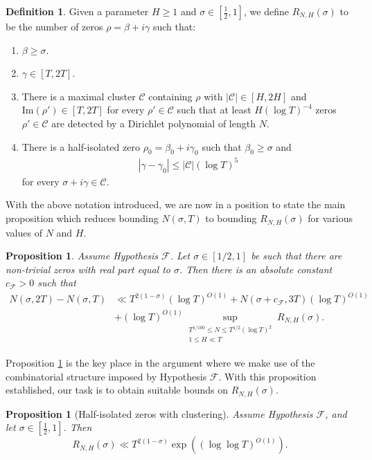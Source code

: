 \documentclass[12pt]{amsart}
\theoremstyle{plain}
\newtheorem{proposition}[theorem]{Proposition}
\theoremstyle{definition}
\newtheorem{definition}[theorem]{Definition}
\theoremstyle{remark}
\begin{document}
\begin{definition}\label{defn:RNH}
Given a parameter $H \ge 1$ and $\sigma \in [\frac{1}{2},1]$, we define $R_{N,H}(\sigma)$ to be the number of zeros $\rho = \beta+i\gamma$ such that:
%
\begin{enumerate}
\item $\beta \geq \sigma$.
\item $\gamma \in [T,2T]$.
\item There is a maximal cluster $\mathcal{C}$ containing $\rho$ with $|\mathcal{C}|\in[H,2H]$ and $\text{Im}(\rho') \in [T,2T]$ for every $\rho' \in \mathcal{C}$ such that at least $H(\log{T})^{-4}$ zeros $\rho'\in\mathcal{C}$ are detected by a Dirichlet polynomial of length $N$.
\item There is a half-isolated zero $\rho_0 = \beta_0 + i\gamma_0$ such that $\beta_0 \geq \sigma$ and
\begin{align*}
|\gamma - \gamma_0| \le |\mathcal{C}|(\log T)^5
\end{align*}
for every $\sigma+i\gamma \in \mathcal{C}$.
\end{enumerate}
\end{definition}
With the above notation introduced, we are now in a position to state the main proposition which reduces bounding $N(\sigma,T)$ to bounding $R_{N,H}(\sigma)$ for various values of $N$ and $H$.
%
%
%
%
\begin{proposition}\label{prop:ClustersReduction}
Assume Hypothesis $\mathcal{F}$. Let $\sigma \in [1/2,1]$ be such that there are non-trivial zeros with real part equal to $\sigma$. Then there is an absolute constant $c_\mathcal{F} > 0$ such that
\begin{align*}
N(\sigma,2T) - N(\sigma,T) &\ll T^{2(1-\sigma)}(\log T)^{O(1)} + N(\sigma+c_\mathcal{F},3T) (\log T)^{O(1)} \\
&+ (\log{T})^{O(1)}\sup_{\substack{T^{1/100} \leq N \leq T^{1/2}(\log T)^2 \\  1\leq H \ll T}}R_{N,H}(\sigma).
\end{align*}
\end{proposition}
%
%
%
%
Proposition \ref{prop:ClustersReduction} is the key place in the argument where we make use of the combinatorial structure imposed by Hypothesis $\mathcal{F}$. With this proposition established, our task is to obtain suitable bounds on $R_{N,H}(\sigma)$.
%
%
%
%
\begin{proposition}[Half-isolated zeros with clustering]\label{prop:HalfIsolatedClustering}
Assume Hypothesis $\mathcal{F}$, and let $\sigma \in [\frac{1}{2},1]$. Then
\[
R_{N,H}(\sigma)\ll T^{2(1-\sigma)}\exp((\log \log T)^{O(1)}).
\]
\end{proposition}
%
%
%
%
\end{document}
